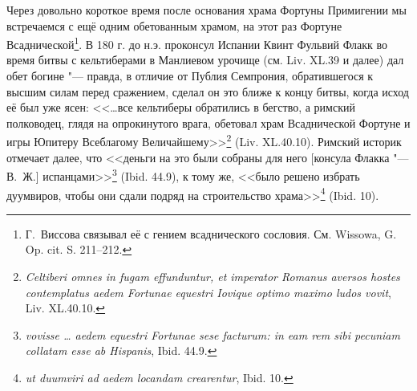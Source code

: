 

Через довольно короткое время после основания храма Фортуны Примигении мы встречаемся с ещё одним обетованным храмом, на этот раз Фортуне Всаднической\footnote{Г.~Виссова связывал её с гением всаднического сословия. См. Wissowa, G. Op. cit. S. 211--212.}. В 180 г. до н.э. проконсул Испании Квинт Фульвий Флакк во время битвы с кельтиберами в Манлиевом урочище (см. Liv. XL.39 и далее) дал обет богине "--- правда, в отличие от Публия Семпрония, обратившегося к высшим силам перед сражением, сделал он это ближе к концу битвы, когда исход её был уже ясен: <<\ldots{}все кельтиберы обратились в бегство, а римский полководец, глядя на опрокинутого врага, обетовал храм Всаднической Фортуне и игры Юпитеру Всеблагому Величайшему>>\footnote{\textit{Celtiberi omnes in fugam effunduntur, et imperator Romanus aversos hostes contemplatus aedem Fortunae equestri Iovique optimo maximo ludos vovit}, Liv. XL.40.10.} (Liv. XL.40.10). Римский историк отмечает далее, что <<деньги на это были собраны для него [консула Флакка "--- В.~Ж.] испанцами>>\footnote{\textit{vovisse \ldots{} aedem equestri Fortunae sese facturum: in eam rem sibi pecuniam collatam esse ab Hispanis}, Ibid. 44.9.} (Ibid. 44.9), к тому же, <<было решено избрать дуумвиров, чтобы они сдали подряд на строительство храма>>\footnote{\textit{ut duumviri ad aedem locandam crearentur}, Ibid. 10.} (Ibid. 10).

